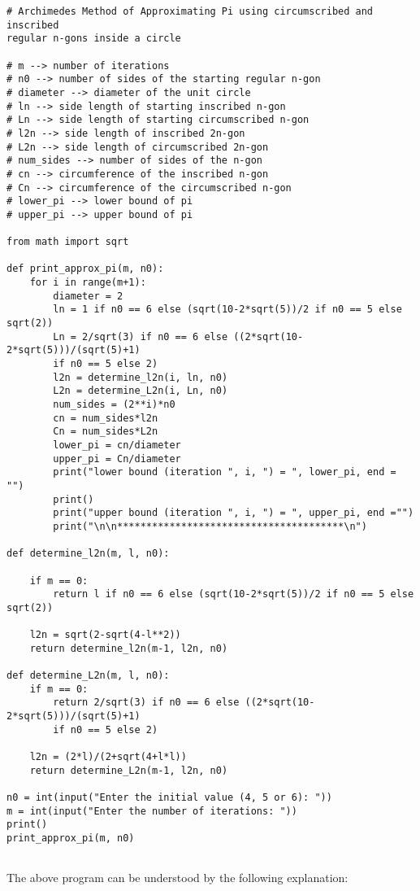 \documentclass[12pt]{article}
\begin{document}
\begin{verbatim}
# Archimedes Method of Approximating Pi using circumscribed and inscribed
regular n-gons inside a circle

# m --> number of iterations
# n0 --> number of sides of the starting regular n-gon
# diameter --> diameter of the unit circle
# ln --> side length of starting inscribed n-gon
# Ln --> side length of starting circumscribed n-gon
# l2n --> side length of inscribed 2n-gon
# L2n --> side length of circumscribed 2n-gon
# num_sides --> number of sides of the n-gon
# cn --> circumference of the inscribed n-gon
# Cn --> circumference of the circumscribed n-gon
# lower_pi --> lower bound of pi
# upper_pi --> upper bound of pi

from math import sqrt

def print_approx_pi(m, n0):
	for i in range(m+1):
		diameter = 2
		ln = 1 if n0 == 6 else (sqrt(10-2*sqrt(5))/2 if n0 == 5 else sqrt(2))
		Ln = 2/sqrt(3) if n0 == 6 else ((2*sqrt(10-2*sqrt(5)))/(sqrt(5)+1)
		if n0 == 5 else 2)
		l2n = determine_l2n(i, ln, n0)
		L2n = determine_L2n(i, Ln, n0)
		num_sides = (2**i)*n0
		cn = num_sides*l2n
		Cn = num_sides*L2n
		lower_pi = cn/diameter
		upper_pi = Cn/diameter
		print("lower bound (iteration ", i, ") = ", lower_pi, end = "")
		print()
		print("upper bound (iteration ", i, ") = ", upper_pi, end ="")
		print("\n\n***************************************\n")
		
def determine_l2n(m, l, n0):

	if m == 0:
		return l if n0 == 6 else (sqrt(10-2*sqrt(5))/2 if n0 == 5 else sqrt(2))

	l2n = sqrt(2-sqrt(4-l**2))
	return determine_l2n(m-1, l2n, n0)
	
def determine_L2n(m, l, n0): 
	if m == 0:
		return 2/sqrt(3) if n0 == 6 else ((2*sqrt(10-2*sqrt(5)))/(sqrt(5)+1)
		if n0 == 5 else 2)
		
	l2n = (2*l)/(2+sqrt(4+l*l))
	return determine_L2n(m-1, l2n, n0)
	
n0 = int(input("Enter the initial value (4, 5 or 6): "))
m = int(input("Enter the number of iterations: "))
print()
print_approx_pi(m, n0)
	
\end{verbatim}
The above program can be understood by the following explanation:
\end{document}
